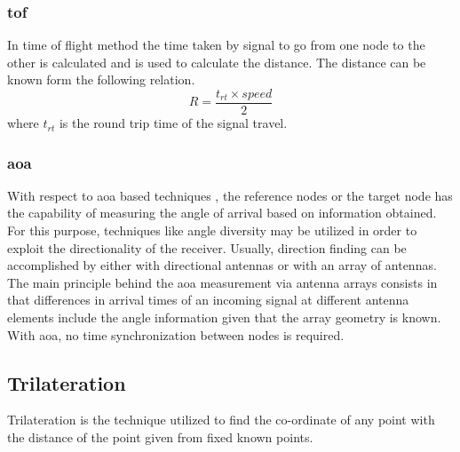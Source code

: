 \subsubsection{\gls{tof}}
In time of flight method the time taken by signal to go from one node to the other is calculated and is used to calculate the distance. The distance can be known form the following relation.
\begin{equation}
	R = \frac{t_{rt} \times speed}{2}
\end{equation}
where $t_{rt}$ is the round trip time of the signal travel.

\subsubsection{\gls{aoa}} 
With respect to \gls{aoa} based techniques , the reference nodes or the target node has the capability of measuring the angle of arrival based on information obtained. For this purpose, techniques like angle diversity may be utilized in order to exploit the directionality of the receiver. Usually, direction finding can be accomplished by either with directional antennas or with an array of antennas. The main  principle behind the \gls{aoa} measurement via antenna arrays consists in that differences in arrival times of an incoming signal at different antenna elements include the angle information given that the array geometry is known. With \gls{aoa}, no time synchronization between nodes is required.\cite{1003.1833}
\subsection{Trilateration}
Trilateration is the technique utilized to find the co-ordinate of any point with the distance of the point given from fixed known points.	

